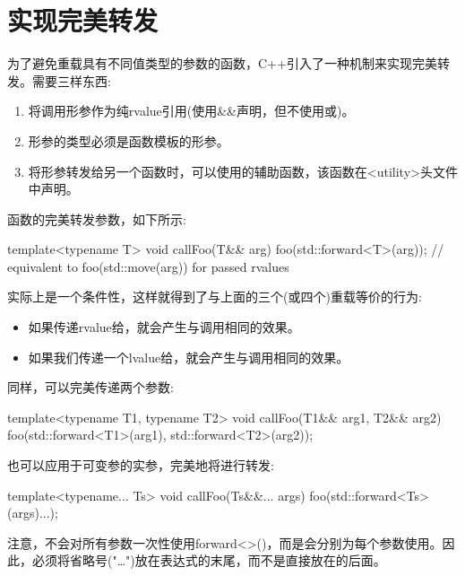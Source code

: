 \section{实现完美转发}
为了避免重载具有不同值类型的参数的函数，C++引入了一种机制来实现完美转发。需要三样东西:

\begin{enumerate}
	\item 将调用形参作为纯rvalue引用(使用\&\&声明，但不使用或)。
	\item 形参的类型必须是函数模板的形参。
	\item 将形参转发给另一个函数时，可以使用的辅助函数，该函数在<utility>头文件中声明。
\end{enumerate}

函数的完美转发参数，如下所示:

\begin{cppcode}
template<typename T>
void callFoo(T&& arg) {
	foo(std::forward<T>(arg)); // equivalent to foo(std::move(arg)) for passed rvalues
}
\end{cppcode}

实际上是一个条件性，这样就得到了与上面的三个(或四个)重载等价的行为:

\begin{itemize}
	\item 如果传递rvalue给，就会产生与调用相同的效果。
	\item 如果我们传递一个lvalue给，就会产生与调用相同的效果。
\end{itemize}

同样，可以完美传递两个参数:

\begin{cppcode}
template<typename T1, typename T2>
void callFoo(T1&& arg1, T2&& arg2) {
	foo(std::forward<T1>(arg1), std::forward<T2>(arg2));
}
\end{cppcode}

也可以应用于可变参的实参，完美地将进行转发:

\begin{cppcode}
template<typename... Ts>
void callFoo(Ts&&... args) {
	foo(std::forward<Ts>(args)...);
}
\end{cppcode}

注意，不会对所有参数一次性使用forward<>()，而是会分别为每个参数使用。因此，必须将省略号("…")放在表达式的末尾，而不是直接放在的后面。

